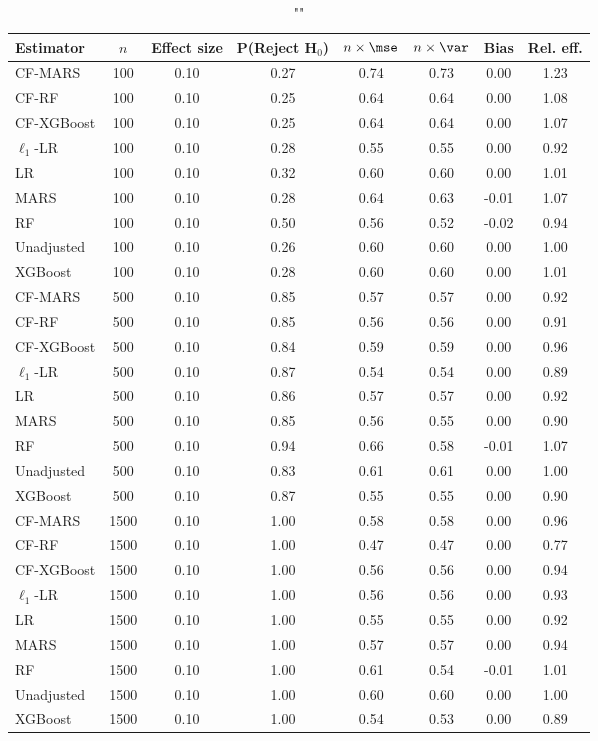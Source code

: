 \begin{table}
\centering
\caption{""}
\begin{tabular}{lccccccc}
\toprule
Estimator & $n$ & Effect size & P(Reject H$_0$) & $n\times\mse$ & $n\times \var$ & Bias & Rel. eff.\\ \midrule
CF-MARS & 100 & 0.10 & 0.27 & 0.74 & 0.73 &  0.00 & 1.23 \\ 
CF-RF & 100 & 0.10 & 0.25 & 0.64 & 0.64 &  0.00 & 1.08 \\ 
CF-XGBoost & 100 & 0.10 & 0.25 & 0.64 & 0.64 &  0.00 & 1.07 \\ 
$\ell_1$-LR & 100 & 0.10 & 0.28 & 0.55 & 0.55 &  0.00 & 0.92 \\ 
LR & 100 & 0.10 & 0.32 & 0.60 & 0.60 &  0.00 & 1.01 \\ 
MARS & 100 & 0.10 & 0.28 & 0.64 & 0.63 & -0.01 & 1.07 \\ 
RF & 100 & 0.10 & 0.50 & 0.56 & 0.52 & -0.02 & 0.94 \\ 
Unadjusted & 100 & 0.10 & 0.26 & 0.60 & 0.60 &  0.00 & 1.00 \\ 
XGBoost & 100 & 0.10 & 0.28 & 0.60 & 0.60 &  0.00 & 1.01 \\ \addlinespace 
CF-MARS & 500 & 0.10 & 0.85 & 0.57 & 0.57 &  0.00 & 0.92 \\ 
CF-RF & 500 & 0.10 & 0.85 & 0.56 & 0.56 &  0.00 & 0.91 \\ 
CF-XGBoost & 500 & 0.10 & 0.84 & 0.59 & 0.59 &  0.00 & 0.96 \\ 
$\ell_1$-LR & 500 & 0.10 & 0.87 & 0.54 & 0.54 &  0.00 & 0.89 \\ 
LR & 500 & 0.10 & 0.86 & 0.57 & 0.57 &  0.00 & 0.92 \\ 
MARS & 500 & 0.10 & 0.85 & 0.56 & 0.55 &  0.00 & 0.90 \\ 
RF & 500 & 0.10 & 0.94 & 0.66 & 0.58 & -0.01 & 1.07 \\ 
Unadjusted & 500 & 0.10 & 0.83 & 0.61 & 0.61 &  0.00 & 1.00 \\ 
XGBoost & 500 & 0.10 & 0.87 & 0.55 & 0.55 &  0.00 & 0.90 \\ \addlinespace 
CF-MARS & 1500 & 0.10 & 1.00 & 0.58 & 0.58 &  0.00 & 0.96 \\ 
CF-RF & 1500 & 0.10 & 1.00 & 0.47 & 0.47 &  0.00 & 0.77 \\ 
CF-XGBoost & 1500 & 0.10 & 1.00 & 0.56 & 0.56 &  0.00 & 0.94 \\ 
$\ell_1$-LR & 1500 & 0.10 & 1.00 & 0.56 & 0.56 &  0.00 & 0.93 \\ 
LR & 1500 & 0.10 & 1.00 & 0.55 & 0.55 &  0.00 & 0.92 \\ 
MARS & 1500 & 0.10 & 1.00 & 0.57 & 0.57 &  0.00 & 0.94 \\ 
RF & 1500 & 0.10 & 1.00 & 0.61 & 0.54 & -0.01 & 1.01 \\ 
Unadjusted & 1500 & 0.10 & 1.00 & 0.60 & 0.60 &  0.00 & 1.00 \\ 
XGBoost & 1500 & 0.10 & 1.00 & 0.54 & 0.53 &  0.00 & 0.89 \\
\bottomrule
\end{tabular}
\end{table}

